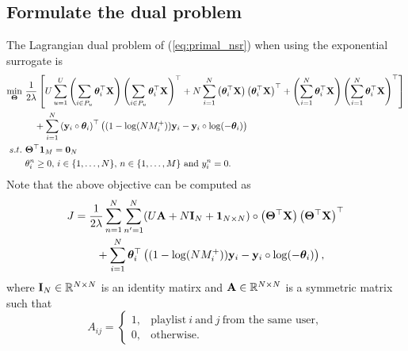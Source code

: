 \subsection{Formulate the dual problem}
The Lagrangian dual problem of (\ref{eq:primal_nsr}) when using the exponential surrogate is
\begin{equation}
\label{eq:dual}
\begin{aligned}
\min_{\mathbf{\Theta}} \ & \frac{1}{2 \lambda} \left[
     U \sum_{u=1}^U \left( \sum_{i \in P_u} \bm{\theta}_i^\top \mathbf{X} \right) \left( \sum_{i \in P_u} \bm{\theta}_i^\top \mathbf{X} \right)^\top
   + N \sum_{i=1}^N \left( \bm{\theta}_i^\top \mathbf{X} \right) \left( \bm{\theta}_i^\top \mathbf{X} \right)^\top
   + \left( \sum_{i=1}^N \bm{\theta}_i^\top \mathbf{X} \right) \left( \sum_{i=1}^N \bm{\theta}_i^\top \mathbf{X} \right)^\top \right] \\
& \hspace{1em}
   + \sum_{i=1}^N \left( \mathbf{y}_i \circ \bm{\theta}_i \right)^\top \left( (1 - \log(N M_i^+)) \mathbf{y}_i - \mathbf{y}_i \circ \log(-\bm{\theta}_i) \right) \\
s.t. \ & \mathbf{\Theta}^\top \mathbf{1}_M = \mathbf{0}_N \\
           & \theta_i^n \ge 0, \, i \in \{1,\dots,N\}, \, n \in \{1,\dots,M\} \ \mathrm{and} \ y_i^n = 0.
\end{aligned}
\end{equation}
Note that the above objective can be computed as
\begin{equation*}
\begin{aligned}
J &= \frac{1}{2 \lambda} \sum_{n=1}^N \sum_{n'=1}^N (U \mathbf{A} + N \mathbf{I}_N + \mathbf{1}_{N \times N}) 
     \circ \left( \mathbf{\Theta}^\top \mathbf{X} \right) \left( \mathbf{\Theta}^\top \mathbf{X} \right)^\top \\
& \hspace{2em}
     + \sum_{i=1}^N \bm{\theta}_i^\top \left( (1 - \log(N M_i^+)) \mathbf{y}_i - \mathbf{y}_i \circ \log(-\bm{\theta}_i) \right),
\end{aligned}
\end{equation*}
where $\mathbf{I}_N \in \mathbb{R}^{N \times N}$ is an identity matirx and $\mathbf{A} \in \mathbb{R}^{N \times N}$ is a symmetric matrix such that
\begin{equation*}
A_{ij} = 
\begin{cases}
1, & \text{playlist} \ i \ \text{and} \ j \ \text{from the same user}, \\
0, & \text{otherwise}.
\end{cases}
\end{equation*}

